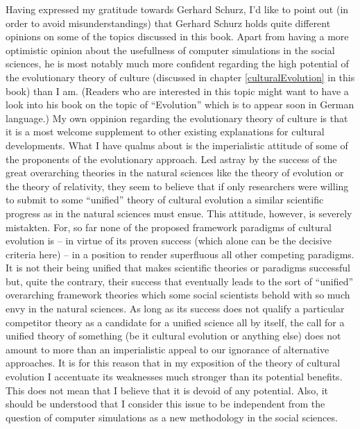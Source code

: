 Having expressed my gratitude towards Gerhard Schurz, I'd like to point out (in order to avoid misunderstandings) that Gerhard Schurz holds quite different opinions on some of the topics discussed in this book. Apart from having a more optimistic opinion about the usefullness of computer simulations in the social sciences, he is most notably much more confident regarding the high potential of the evolutionary theory of culture (discussed in chapter \ref{culturalEvolution} in this book) than I am. (Readers who are interested in this topic might want to have a look into his book on the topic of ``Evolution'' which is to appear soon in German language.) My own oppinion regarding the evolutionary theory of culture is that it is a most welcome supplement to other existing explanations for cultural developments. What I have qualms about is the imperialistic attitude of some of the proponents of the evolutionary approach. Led astray by the success of the great overarching theories in the natural sciences like the theory of evolution or the theory of relativity, they seem to believe that if only researchers were willing to submit to some ``unified'' theory of cultural evolution a similar scientific progress as in the natural sciences must ensue. This attitude, however, is severely mistakten. For, so far none of the proposed framework paradigms of cultural evolution is -- in virtue of its proven success (which alone can be the decisive criteria here) -- in a position to render superfluous all other competing paradigms. It is not their being unified that makes scientific theories or paradigms successful but, quite the contrary, their success that eventually leads to the sort of ``unified'' overarching framework theories which some social scientists behold with so much envy in the natural sciences. As long as its success does not qualify a particular competitor theory as a candidate for a unified science all by itself, the call for a unified theory of something (be it cultural evolution or anything else) does not amount to more than an imperialistic appeal to our ignorance of alternative approaches. It is for this reason that in my exposition of the theory of cultural evolution I accentuate its weaknesses much stronger than its potential benefits. This does not mean that I believe that it is devoid of any potential. Also, it should be understood that I consider this issue to be independent from the question of computer simulations as a new methodology in the social sciences.
